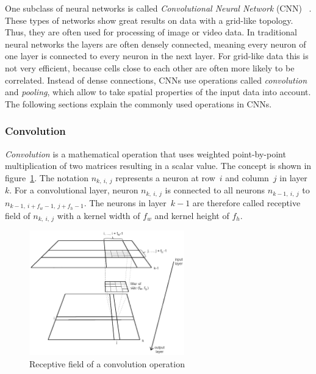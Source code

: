 One subclass of neural networks is called \emph{Convolutional Neural Network} (CNN) ~\cite[p.~359]{praxiseinstieg_ml17}. These types of networks show great results on data with a grid-like topology. Thus, they are often used for processing of image or video data. In traditional neural networks the layers are often densely connected, meaning every neuron of one layer is connected to every neuron in the next layer. For grid-like data this is not very efficient, because cells close to each other are often more likely to be correlated. Instead of dense connections, CNNs use operations called \emph{convolution} and \emph{pooling}, which allow to take spatial properties of the input data into account. The following sections explain the commonly used operations in CNNs.

\subsubsection{Convolution}
\label{sec:convolution}
\emph{Convolution} is a mathematical operation that uses weighted point-by-point multiplication of two matrices resulting in a scalar value. The concept is shown in figure~\ref{fig:convolution}. The notation $n_{k,~i,~j}$ represents a neuron at row~$i$ and column~$j$ in layer~$k$. For a convolutional layer, neuron $n_{k,~i,~j}$ is connected to all neurons $n_{k-1,~i,~j}$ to $n_{k-1,~i + f_w -1,~j + f_h -1}$. The neurons in layer~$k-1$ are therefore called receptive field of $n_{k,~i,~j}$ with a kernel width of $f_w$ and kernel height of $f_h$.~\cite[p.~361 f]{praxiseinstieg_ml17}

\begin{figure}[h]
    \centering
    \includegraphics[width=0.6\textwidth]{images/convolution_template}
    \caption{Receptive field of a convolution operation}
    \label{fig:convolution}
\end{figure}

